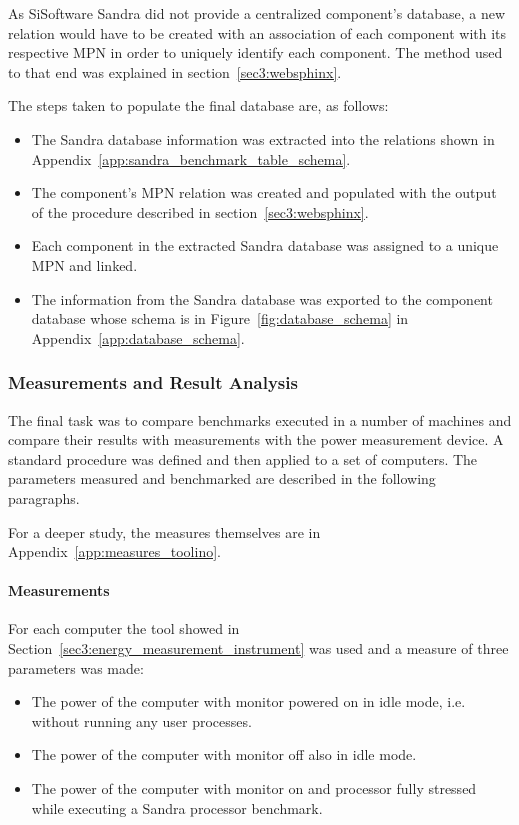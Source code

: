         As SiSoftware Sandra did not provide a centralized component's database, a new relation would have to be created with an association of each component with its respective MPN in order to uniquely identify each component. The method used to that end was explained in section~\ref{sec3:websphinx}.
    
        The steps taken to populate the final database are, as follows:
        \begin{itemize}
            \item The Sandra database information was extracted into the relations shown in Appendix~\ref{app:sandra_benchmark_table_schema}.
            \item The component's MPN relation was created and populated with the output of the procedure described in section~\ref{sec3:websphinx}.
            \item Each component in the extracted Sandra database was assigned to a unique MPN and linked.
            \item The information from the Sandra database was exported to the component database whose schema is in Figure~\ref{fig:database_schema} in Appendix~\ref{app:database_schema}.
        \end{itemize}
    
    \subsubsection*{Measurements and Result Analysis}
        The final task was to compare benchmarks executed in a number of machines and compare their results with measurements with the power measurement device. A standard procedure was defined and then applied to a set of computers. The parameters measured and benchmarked are described in the following paragraphs.
        
        For a deeper study, the measures themselves are in Appendix~\ref{app:measures_toolino}.

        \paragraph*{Measurements}
            For each computer the tool showed in Section~\ref{sec3:energy_measurement_instrument} was used and a measure of three parameters was made:
            \begin{itemize}
                \item The power of the computer with monitor powered on in idle mode, i.e. without running any user processes.
                \item The power of the computer with monitor off also in idle mode.
                \item The power of the computer with monitor on and processor fully stressed while executing a Sandra processor benchmark.
            \end{itemize}
            
